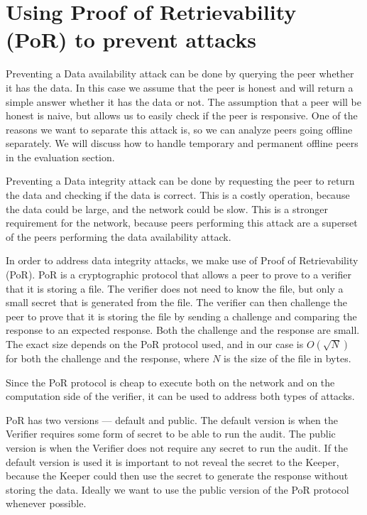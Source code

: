 \section{Using Proof of Retrievability (PoR) to prevent attacks}

Preventing a Data availability attack can be done by querying the peer whether it has the data.
In this case we assume that the peer is honest and will return a simple answer whether it has the data or not.
The assumption that a peer will be honest is naive, but allows us to easily check if the peer is responsive.
One of the reasons we want to separate this attack is, so we can analyze peers going offline separately.
We will discuss how to handle temporary and permanent offline peers in the evaluation section.

Preventing a Data integrity attack can be done by requesting the peer to return the data and checking if
the data is correct.
This is a costly operation, because the data could be large, and the network could be slow.
This is a stronger requirement for the network, because peers performing this attack are a superset
of the peers performing the data availability attack.

In order to address data integrity attacks, we make use of Proof of Retrievability (PoR).
PoR is a cryptographic protocol that allows a peer to prove to a verifier that it is storing a file.
The verifier does not need to know the file, but only a small secret that is generated from the file.
The verifier can then challenge the peer to prove that it is storing the file by sending a challenge and
comparing the response to an expected response.
Both the challenge and the response are small.
The exact size depends on the PoR protocol used, and in our case is $O(\sqrt{N})$ \cite{poralgebra} for
both the challenge and the response, where $N$ is the size of the file in bytes.

Since the PoR protocol is cheap to execute both on the network and on the computation side of the verifier,
it can be used to address both types of attacks.

PoR has two versions --- default and public.
The default version is when the Verifier requires some form of secret to be able to run the audit.
The public version is when the Verifier does not require any secret to run the audit.
If the default version is used it is important to not reveal the secret to the Keeper,
because the Keeper could then use the secret to generate the response without storing the data.
Ideally we want to use the public version of the PoR protocol whenever possible.

